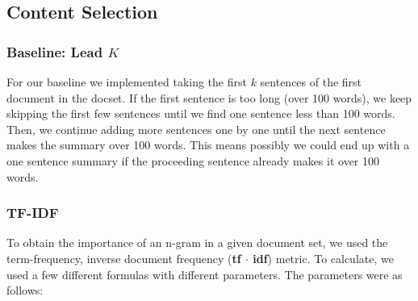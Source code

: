 \subsection{Content Selection}

\subsubsection{Baseline: Lead $K$}

    For our baseline we implemented taking the first $k$ sentences of the first document in the docset. If the first sentence is too long (over 100 words), we keep skipping the first few sentences until we find one sentence less than 100 words. Then, we continue adding more sentences one by one until the next sentence makes the summary over 100 words. This means possibly we could end up with a one sentence summary if the proceeding sentence already makes it over 100 words.

\subsubsection{TF-IDF}\label{content_selection_tf_idf}

    To obtain the importance of an n-gram in a given document set, we used the term-frequency, inverse document frequency (\textbf{tf $\cdot$ idf}) metric. To calculate, we used a few different formulas with different parameters. The parameters were as follows:

